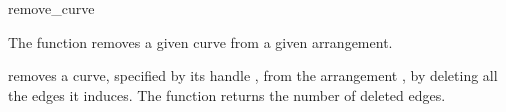 \ccRefPageBegin

\begin{ccRefFunction}{remove_curve}

\ccDefinition

The function \ccRefName{} removes a given curve from a given arrangement.



\ccRefName{} removes a curve, specified by its handle , from
the arrangement , by deleting all the edges it induces. The
function returns the number of deleted edges.

\end{ccRefFunction}

\ccRefPageEnd
